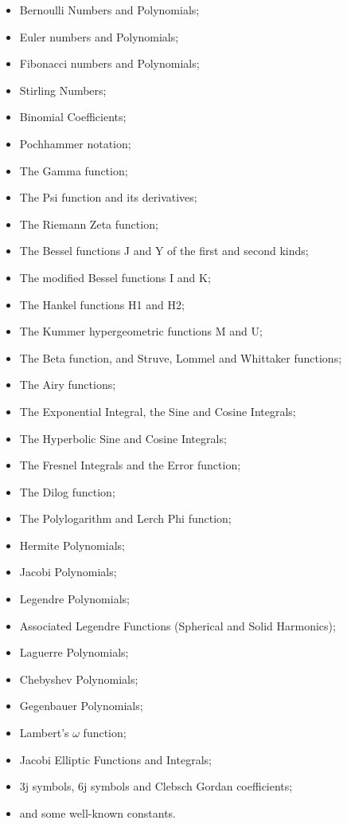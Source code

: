 \documentclass[11pt,letterpaper]{book}
\begin{document}
\begin{itemize}
\item Bernoulli Numbers and Polynomials;
\item Euler numbers and Polynomials;
\item Fibonacci numbers and Polynomials;
\item Stirling Numbers;
\item Binomial Coefficients;
\item Pochhammer notation;
\item The Gamma function;
\item The Psi function and its derivatives;
\item The Riemann Zeta function;
\item The Bessel functions J and Y of the first and second kinds;
\item The modified Bessel functions I and K;
\item The Hankel functions H1 and H2;
\item The Kummer hypergeometric functions M and U;
\item The Beta function, and Struve, Lommel and Whittaker functions;
\item The Airy functions;
\item The Exponential Integral, the Sine and Cosine Integrals;
\item The Hyperbolic Sine and Cosine Integrals;
\item The Fresnel Integrals and the Error function;
\item The Dilog function;
\item The Polylogarithm and Lerch Phi function;
\item Hermite Polynomials;
\item Jacobi Polynomials;
\item Legendre Polynomials;
\item Associated Legendre Functions (Spherical and Solid Harmonics);
\item Laguerre Polynomials;
\item Chebyshev Polynomials;
\item Gegenbauer Polynomials;
\item Lambert's $\omega$ function;
\item Jacobi Elliptic Functions and Integrals;
\item 3j symbols, 6j symbols and Clebsch Gordan coefficients;
\item and some well-known constants.
\end{itemize}
\end{document}
